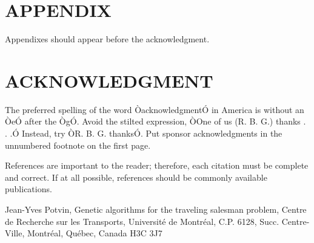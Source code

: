 \documentclass[letterpaper, 10 pt, conference]{ieeeconf}  %
\begin{document}
\section*{APPENDIX}

Appendixes should appear before the acknowledgment.

\section*{ACKNOWLEDGMENT}

The preferred spelling of the word ÒacknowledgmentÓ in America is without an ÒeÓ after the ÒgÓ. Avoid the stilted expression, ÒOne of us (R. B. G.) thanks . . .Ó  Instead, try ÒR. B. G. thanksÓ. Put sponsor acknowledgments in the unnumbered footnote on the first page.




References are important to the reader; therefore, each citation must be complete and correct. If at all possible, references should be commonly available publications.



\begin{thebibliography}{99}

 Jean-Yves Potvin, Genetic algorithms for the
traveling salesman problem,
Centre de Recherche sur les Transports, Université de Montréal,
C.P. 6128, Succ. Centre-Ville, Montréal, Québec, Canada H3C 3J7 





\end{thebibliography}
\end{document}
